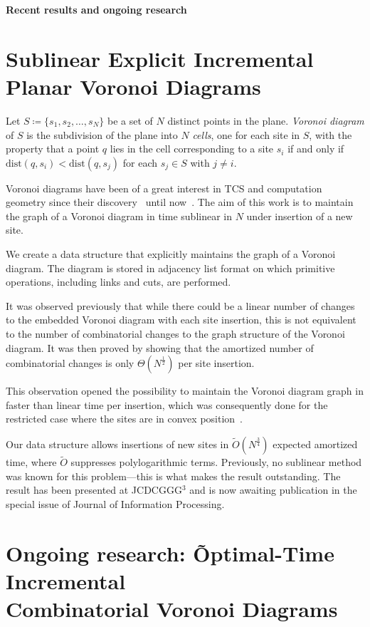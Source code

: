 \documentclass[a4paper,11pt]{article}
\def\vsection#1{\vspace{-4mm}\section{#1}\vspace{-3mm}}
\theoremstyle{definition}
\begin{document}
\def\P{\mathcal P} \def\Ot{\tilde O}

\begin{center}
	{\LARGE\bf Recent results and ongoing research}
\end{center} \vspace{-4.5mm}

\vsection{Sublinear Explicit Incremental Planar Voronoi Diagrams}

	Let $S \coloneqq \{s_1, s_2, \ldots, s_N\}$ be a set of $N$ distinct points in the plane. \emph{Voronoi diagram} of $S$ is the subdivision of the plane into $N$ \emph{cells}, one for each site in $S$, with the property that a point $q$ lies in the cell corresponding to a site $s_i$ if and only if $\mathrm{dist} (q, s_i) < \mathrm{dist} (q, s_j)$ for each $s_j \in S$ with $j \ne i$.

Voronoi diagrams have been of a great interest in TCS and computation geometry since their discovery~\cite{v-vd} until now~\cite{vd-new}. The aim of this work is to maintain the graph of a Voronoi diagram in time sublinear in $N$ under insertion of a new site.

We create a data structure that explicitly maintains the graph of a Voronoi diagram. The diagram is stored in adjacency list format on which primitive operations, including links and cuts, are performed.

It was observed previously that while there could be a linear number of changes to the embedded Voronoi diagram with each site insertion, this is not equivalent to the number of combinatorial changes to the graph structure of the Voronoi diagram.
It was then proved by showing that the amortized number of combinatorial changes is only $\Theta(N^{\frac 12})$ per site insertion.

This observation opened the possibility to maintain the Voronoi diagram graph in faster than linear time per insertion, which was consequently done for the restricted case where the sites are in convex position~\cite{incremental-vd}.

Our data structure allows insertions of new sites in $\Ot (N^{\frac 34})$ expected amortized time, where $\Ot$ suppresses polylogarithmic terms. Previously, no sublinear method was known for this problem—this is what makes the result outstanding. The result has been presented at JCDCGGG$^3$ and is now awaiting publication in the special issue of Journal of Information Processing.

\vsection{Ongoing research: \~Optimal-Time Incremental \\
	Combinatorial Voronoi Diagrams}
\end{document}
